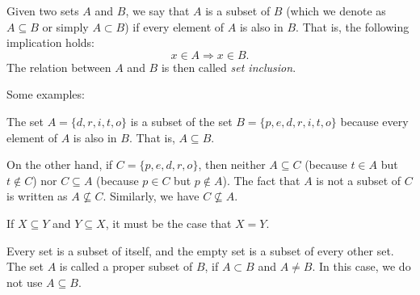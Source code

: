 \documentclass[12pt]{article}
\begin{document}
Given two sets $A$ and $B$, we say that $A$ is a subset of $B$ (which we denote as $A\subseteq B$ or simply $A\subset B$) if every element of $A$ is also in $B$. That is, the following implication holds:
$$x\in A\Rightarrow x\in B.$$
The relation between $A$ and $B$ is then called {\em set inclusion}.

Some examples:

The set $A=\{d,r,i,t,o\}$ is a subset of the set $B=\{p,e,d,r,i,t,o\}$ because every element of $A$ is also in $B$. That is, $A\subseteq B$. 

On the other hand, if $C=\{p,e,d,r,o\}$, then neither $A \subseteq C$ (because $t\in A$ but $t\not\in C$) nor $C \subseteq A$ (because $p\in C$ but $p\not\in A$).  The fact that $A$ is not a subset of $C$ is written as $A\not\subseteq C$.  Similarly, we have $C\not\subseteq A$.

If $X\subseteq Y$ and $Y\subseteq X$, it must be the case that $X=Y$.

Every set is a subset of itself, and the empty set is a subset of every other set.  The set $A$ is called a proper subset of $B$, if $A\subset B$ and $A\neq B$.  In this case, we do not use $A\subseteq B$.
\end{document}
